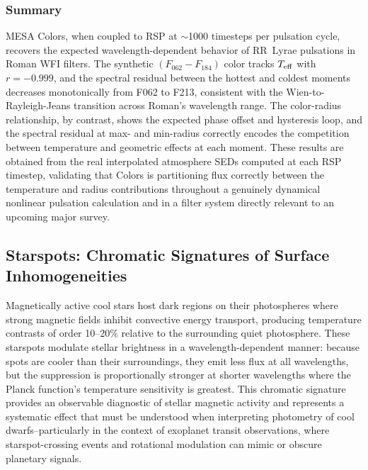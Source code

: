 \documentclass[linenumbers,apj,twocolumn, floatfix]{aastex701}
\begin{document}
\subsubsection{Summary}
\label{sec:rsp_summary}

MESA Colors, when coupled to RSP at $\sim$1000 timesteps per pulsation cycle, recovers the expected wavelength-dependent behavior of RR~Lyrae pulsations in Roman WFI filters.
The synthetic $(F_{062} - F_{184})$ color tracks $T_{\rm eff}$ with $r = -0.999$, and the spectral residual between the hottest and coldest moments decreases monotonically from F062 to F213, consistent with the Wien-to-Rayleigh-Jeans transition across Roman's wavelength range.
The color-radius relationship, by contrast, shows the expected phase offset and hysteresis loop, and the spectral residual at max- and min-radius correctly encodes the competition between temperature and geometric effects at each moment.
These results are obtained from the real interpolated atmosphere SEDs computed at each RSP timestep, validating that Colors is partitioning flux correctly between the temperature and radius contributions throughout a genuinely dynamical nonlinear pulsation calculation and in a filter system directly relevant to an upcoming major survey.

\subsection{Starspots: Chromatic Signatures of Surface Inhomogeneities}
\label{sec:demo_starspots}

Magnetically active cool stars host dark regions on their photospheres where strong magnetic fields inhibit convective energy transport, producing temperature contrasts of order 10--20\% relative to the surrounding quiet photosphere.
These starspots modulate stellar brightness in a wavelength-dependent manner: because spots are cooler than their surroundings, they emit less flux at all wavelengths, but the suppression is proportionally stronger at shorter wavelengths where the Planck function's temperature sensitivity is greatest.
This chromatic signature provides an observable diagnostic of stellar magnetic activity and represents a systematic effect that must be understood when interpreting photometry of cool dwarfs--particularly in the context of exoplanet transit observations, where starspot-crossing events and rotational modulation can mimic or obscure planetary signals.
\end{document}
